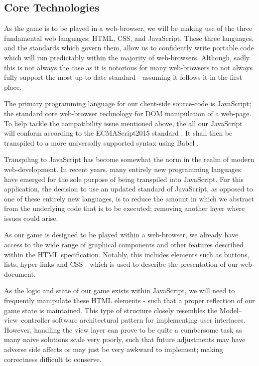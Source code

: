 \documentclass{standalone}
\begin{document}
		\subsection{Core Technologies} \label{sec:coreTechnologies}
			As the game is to be played in a web-browser, we will be making use of the three fundamental web languages; HTML, CSS, and JavaScript. These three languages, and the standards which govern them, allow us to confidently write portable code which will run predictably within the majority of web-browsers. Although, sadly this is not always the case as it is notorious for many web-browsers to not always fully support the most up-to-date standard - assuming it follows it in the first place.

			The primary programming language for our client-side source-code is JavaScript; the standard core web-browser technology for DOM manipulation of a web-page. To help tackle the compatibility issue mentioned above, the all our JavaScript will conform according to the ECMAScript2015 standard \parencite{ECMAScript2015}. It shall then be transpiled to a more universally supported syntax using Babel \parencite{Babel}.

			Transpiling to JavaScript has become somewhat the norm in the realm of modern web-development. In recent years, many entirely new programming languages have emerged for the sole purpose of being transpiled into JavaScript. For this application, the decision to use an updated standard of JavaScript, as opposed to one of these entirely new languages, is to reduce the amount in which we abstract from the underlying code that is to be executed; removing another layer where issues could arise.

			As our game is designed to be played within a web-browser, we already have access to the wide range of graphical components and other features described within the HTML specification. Notably, this includes elements such as buttons, lists, hyper-links and CSS - which is used to describe the presentation of our web-document.

			As the logic and state of our game exists within JavaScript, we will need to frequently manipulate these HTML elements - such that a proper reflection of our game state is maintained. This type of structure closely resembles the Model–view–controller \parencite{MVC} software architectural pattern for implementing user interfaces. However, handling the view layer can prove to be quite a cumbersome task as many naive solutions scale very poorly, such that future adjustments may have adverse side affects or may just be very awkward to implement; making correctness difficult to conserve.
\end{document}

